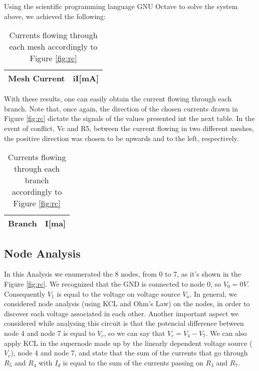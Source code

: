 Using the scientific programming language GNU Octave to solve the system above, we achieved the following:

\begin{table}[h]
  \centering
  \begin{tabular}{|l|r|}
    \hline    
    {\bf Mesh Current} & {\bf iI[mA]} \\ \hline
    
 \end{tabular}
 \caption{Currents flowing through each mesh accordingly to Figure \ref{fig:rc}}
  \label{tab:op}
\end{table}

With these results, one can easily obtain the current flowing through each branch. Note that, once again, the direction of the chosen currents drawn in Figure \ref{fig:rc} dictate the signals of the values presented int the next table. In the event of conflict, Vc and R5, between the current flowing in two different meshes, the positive direction was chosen to be upwards and to the left, respectively.

\begin{table}[h]
  \centering
  \begin{tabular}{|l|r|}
    \hline    
    {\bf Branch} & {\bf I[ma]} \\ \hline
    
 \end{tabular}
 \caption{Currents flowing through each branch accordingly to Figure \ref{fig:rc}}
  \label{tab:op}
  \label{tab:op}
\end{table}


\subsection{Node Analysis}
In this Analysis we enumerated the 8 nodes, from 0 to 7, as it's shown in the Figure \ref{fig:rc}. We recognized that the GND is connected to node 0, so $V_{0}=0V$. Consequently $V_1$ is equal to the voltage on voltage source $V_a$. In general, we considered node analysis (using KCL and Ohm's Law) on the nodes, in order to discover each voltage associated in each other. Another important aspect we considered while analysing this circuit is that the potencial difference between node 4 and node 7 is equal to $V_c$, so we can say that $V_c=V_4-V_7$. We can also apply KCL in the supernode made up by the linearly dependent voltage source ($V_c$), node 4 and node 7, and state that the sum of the currents that go through $R_5$ and $R_4$ with $I_d$ is equal to the sum of the currents passing on $R_3$ and $R_7$.


